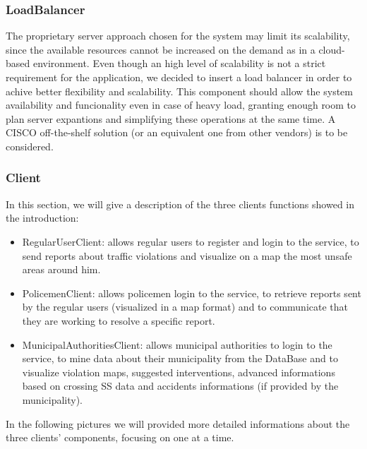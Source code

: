 \subsubsection{LoadBalancer}
The proprietary server approach chosen for the system may limit its scalability, since the available resources cannot be increased on the demand as in a cloud-based environment. Even though an high level of scalability is not a strict requirement for the application, we decided to insert a load balancer in order to achive better flexibility and scalability. This component should allow the system availability and funcionality even in case of heavy load, granting enough room to plan server expantions and simplifying these operations at the same time. \newline
A CISCO off-the-shelf solution (or an equivalent one from other vendors) is to be considered.

\subsubsection{Client}
In this section, we will give a description of the three clients functions showed in the introduction:
\begin{itemize}
	\item RegularUserClient: allows regular users to register and login to the service, to send reports about traffic violations and visualize on a map the most unsafe areas around him.
	\item PolicemenClient: allows policemen login to the service, to retrieve reports sent by the regular users (visualized in a map format) and to communicate that they are working to resolve a specific report.
	\item MunicipalAuthoritiesClient: allows municipal authorities to login to the service, to mine data about their municipality from the DataBase and to visualize violation maps, suggested interventions, advanced informations based on crossing SS data and accidents informations (if provided by the municipality).
\end{itemize}
In the following pictures we will provided more detailed informations about the three clients' components, focusing on one at a time.

